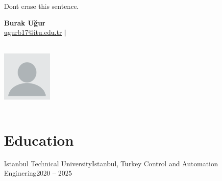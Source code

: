 \label{ResumeThree} %
\thesisspacing %


{\color{white}Dont erase this sentence.}
\medskip



\begin{minipage}{0.7\textwidth}
    \textbf{\Huge Burak Uğur} \\[5pt]
    \small \href{mailto:youremail@example.com}{ugurb17@itu.edu.tr} $|$ 
\end{minipage}
\begin{minipage}{0.3\textwidth}
    \begin{flushright}
        \includegraphics[width=2.5cm, height=3.5cm]{imgs/your_photo.png} %
    \end{flushright}
\end{minipage}

\section*{Education}
\begin{itemize}[leftmargin=*]
    \resumeEntry
        {Istanbul Technical University}{Istanbul, Turkey}
        {Control and Automation Enginering}{2020 – 2025}
\end{itemize}

